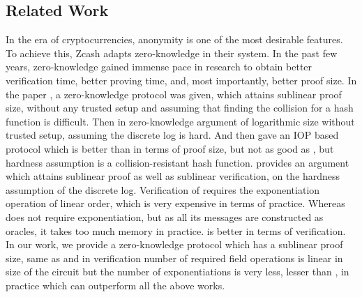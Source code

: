 \subsection{Related Work}

In the era of cryptocurrencies, anonymity is one of the most desirable features. To achieve this, Zcash adapts zero-knowledge in their system. In the past few years, zero-knowledge gained immense pace in research to obtain better verification time, better proving time, and, most importantly, better proof size. In the paper \cite{ligero}, a zero-knowledge protocol was given, which attains sublinear proof size, without any trusted setup and assuming that finding the collision for a hash function is difficult. Then in \cite{Bulletproofs} zero-knowledge argument of logarithmic size without trusted setup, assuming the discrete log is hard. And then \cite{Aurora} gave an IOP based protocol which is better than \cite{ligero} in terms of proof size, but not as good as \cite{Bulletproofs}, but hardness assumption is a collision-resistant hash function. \cite{spartan} provides an argument which attains sublinear proof as well as sublinear verification, on the hardness assumption of the discrete log. Verification of \cite{Bulletproofs} requires the exponentiation operation of linear order, which is very expensive in terms of practice. Whereas \cite{Aurora} does not require exponentiation, but as all its messages are constructed as oracles, it takes too much memory in practice. \cite{spartan} is better in terms of verification. In our work, we provide a zero-knowledge protocol which has a sublinear proof size, same as \cite{spartan} and in verification number of required field operations is linear in size of the circuit but the number of exponentiations is very less, lesser than \cite{spartan}, in practice which can outperform all the above works.

